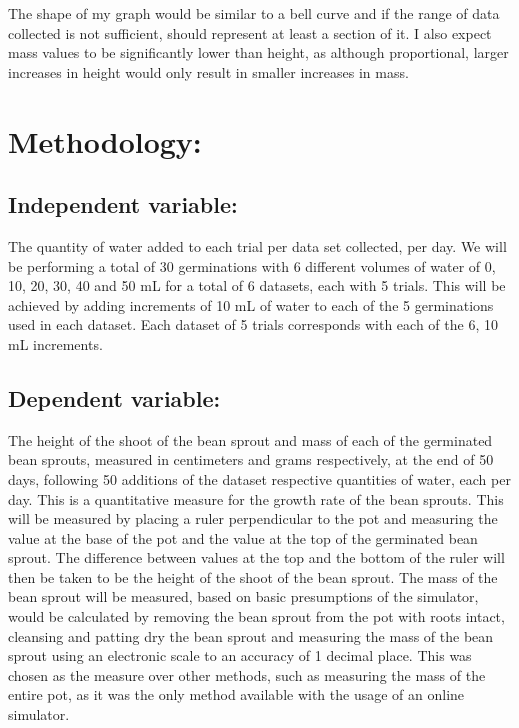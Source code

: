 \documentclass[11pt, a4]{article}
\begin{document}
		\bigbreak

		The shape of my graph would be similar to a bell curve and if the range of data collected is not sufficient, should represent at least a section of it. I also expect mass values to be significantly lower than height, as although proportional, larger increases in height would only result in smaller increases in mass.

	\section{Methodology:}
		\subsection{Independent variable:}
		The quantity of water added to each trial per data set collected, per day. We will be performing a total of 30 germinations with 6 different volumes of water of 0, 10, 20, 30, 40 and 50 mL for a total of 6 datasets, each with 5 trials. This will be achieved by adding increments of 10 mL of water to each of the 5 germinations used in each dataset. Each dataset of 5 trials corresponds with each of the 6, 10 mL increments.
		\subsection{Dependent variable:}
			The height of the shoot of the bean sprout and mass of each of the germinated bean sprouts, measured in centimeters and grams respectively, at the end of 50 days, following 50 additions of the dataset respective quantities of water, each per day. This is a quantitative measure for the growth rate of the bean sprouts. This will be measured  by placing a ruler perpendicular to the pot and measuring the value at the base of the pot and the value at the top of the germinated bean sprout. The difference between values at the top and the bottom of the ruler will then be taken to be the height of the shoot of the bean sprout. The mass of the bean sprout will be measured, based on basic presumptions of the simulator, would be calculated by removing the bean sprout from the pot with roots intact, cleansing and patting dry the bean sprout and measuring the mass of the bean sprout using an electronic scale to an accuracy of 1 decimal place. This was chosen as the measure over other methods, such as measuring the mass of the entire pot, as it was the only method available with the usage of an online simulator.
\end{document}
